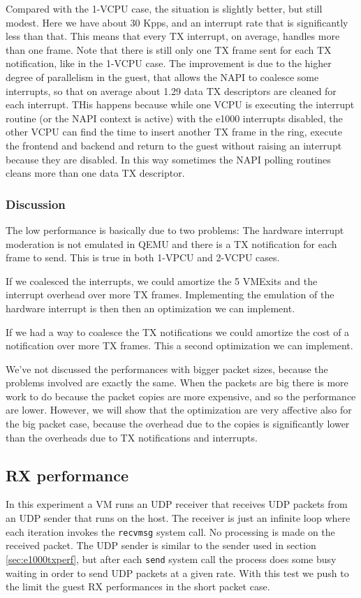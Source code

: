 Compared with the 1-VCPU case, the situation is slightly better, but still modest. Here we have about 30 Kpps, and an interrupt rate
that is significantly less than that. This means that every TX interrupt, on average, handles more than one frame.
Note that there is still only one TX frame sent for each TX notification, like in the 1-VCPU case.
The improvement is due to the higher degree of parallelism in the guest, that allows the NAPI to coalesce some interrupts, so that
on average about 1.29 data TX descriptors are cleaned for each interrupt. THis happens because while one VCPU is executing the interrupt
routine (or the NAPI context is active) with the e1000 interrupts disabled, the other VCPU can find the time to insert another TX frame
in the ring, execute the frontend and backend and return to the guest without raising an interrupt because they are disabled.
In this way sometimes the NAPI polling routines cleans more than one data TX descriptor.


\subsubsection{Discussion}
\label{sec:e1000txperfdiscuss}
The low performance is basically due to two problems: The hardware interrupt moderation is not emulated in QEMU and there is a TX 
notification for each frame to send. This is true in both 1-VPCU and 2-VCPU cases.

If we coalesced the interrupts, we could amortize the 5 VMExits and the interrupt overhead over more TX frames.
Implementing the emulation of the hardware interrupt is then then an optimization we can implement.

If we had a way to coalesce the TX notifications we could amortize the cost of a notification over more TX frames. This
a second optimization we can implement.

\vspace{0.5cm}

We've not discussed the performances with bigger packet sizes, because the problems involved are exactly the same. When the packets are 
big there is more work to do because the packet copies are more expensive, and so the performance are lower. However, we will show that
the optimization are very affective also for the big packet case, because the overhead due to the copies is significantly lower than
the overheads due to TX notifications and interrupts.



\subsection{RX performance}
In this experiment a VM runs an UDP receiver that receives UDP packets from an UDP sender that runs on the host. The receiver is just an 
infinite loop where each iteration invokes the \texttt{recvmsg} system call. No processing is made on the received packet.
The UDP sender is similar to the sender used in section \ref{sec:e1000txperf}, but after each \texttt{send} system call the process
does some busy waiting in order to send UDP packets at a given rate.
With this test we push to the limit the guest RX performances in the short packet case.

